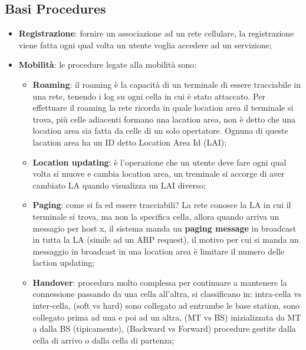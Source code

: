 \documentclass[12pt]{article}
\begin{document}
\subsection{Basi Procedures}
\begin{itemize}
    \item \textbf{Registrazione}: fornire un associazione ad un rete cellulare, la registrazione viene fatta ogni qual volta un utente voglia accedere ad un servizione;
    \item \textbf{Mobilit\`a}: le procedure legate alla mobilit\`a sono:
        \begin{itemize}
            \item \textbf{Roaming}: il roaming \`e la capacit\`a di un terminale di essere tracciabile in una rete, tenendo i log su ogni cella in cui \`e stato attaccato. Per effettuare il roaming la rete ricorda in quale location area il terminale si trova, pi\`u celle adiacenti formano una lacation area, non \`e detto che una location area sia fatta da celle di un solo opertatore. Ognuna di queste lacation area ha un ID detto Location Area Id (LAI);
            \item \textbf{Location updating}: \`e l'operazione che un utente deve fare ogni qual volta si muove e cambia location area, un treminale si accorge di aver cambiato LA quando visualizza un LAI diverso;
            \item \textbf{Paging}: come si fa ed essere tracciabili? La rete conosce la LA in cui il terminale si trova, ma non la specifica cella, allora quando arriva un messagio per host x, il sistema manda un \textbf{paging message} in broadcast in tutta la LA (simile ad un ARP request), il motivo per cui si manda un messaggio in broadcast in una location area \`e limitare il numero delle laction updating;
            \item \textbf{Handover}: procedura molto complessa per continuare a mantenere la connessione passando da una cella all'altra, si classificano in: intra-cella vs inter-cella, (soft vs hard) sono collegato ad entrambe le base station, sono collegato prima ad una e poi ad un altra, (MT vs BS) inizializzata da MT a dalla BS (tipicamente), (Backward vs Forward) procedure gestite dalla cella di arrivo o dalla cella di partenza;
        \end{itemize}
\end{itemize}
\end{document}
